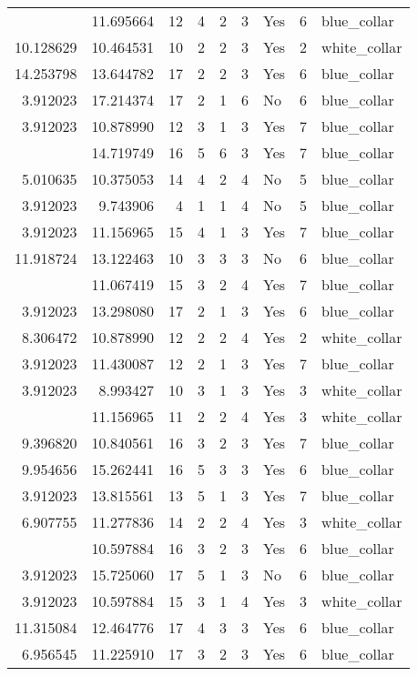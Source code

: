\documentclass[
]{article}
\begin{document}
\begin{longtable}[t]{rrrrrllrl}
\addlinespace
9.905984 & 11.695664 & 12 & 4 & 2 & 3 & Yes & 6 & blue\_collar\\
10.128629 & 10.464531 & 10 & 2 & 2 & 3 & Yes & 2 & white\_collar\\
14.253798 & 13.644782 & 17 & 2 & 2 & 3 & Yes & 6 & blue\_collar\\
3.912023 & 17.214374 & 17 & 2 & 1 & 6 & No & 6 & blue\_collar\\
3.912023 & 10.878990 & 12 & 3 & 1 & 3 & Yes & 7 & blue\_collar\\
\addlinespace
10.715528 & 14.719749 & 16 & 5 & 6 & 3 & Yes & 7 & blue\_collar\\
5.010635 & 10.375053 & 14 & 4 & 2 & 4 & No & 5 & blue\_collar\\
3.912023 & 9.743906 & 4 & 1 & 1 & 4 & No & 5 & blue\_collar\\
3.912023 & 11.156965 & 15 & 4 & 1 & 3 & Yes & 7 & blue\_collar\\
11.918724 & 13.122463 & 10 & 3 & 3 & 3 & No & 6 & blue\_collar\\
\addlinespace
7.279319 & 11.067419 & 15 & 3 & 2 & 4 & Yes & 7 & blue\_collar\\
3.912023 & 13.298080 & 17 & 2 & 1 & 3 & Yes & 6 & blue\_collar\\
8.306472 & 10.878990 & 12 & 2 & 2 & 4 & Yes & 2 & white\_collar\\
3.912023 & 11.430087 & 12 & 2 & 1 & 3 & Yes & 7 & blue\_collar\\
3.912023 & 8.993427 & 10 & 3 & 1 & 3 & Yes & 3 & white\_collar\\
\addlinespace
5.247024 & 11.156965 & 11 & 2 & 2 & 4 & Yes & 3 & white\_collar\\
9.396820 & 10.840561 & 16 & 3 & 2 & 3 & Yes & 7 & blue\_collar\\
9.954656 & 15.262441 & 16 & 5 & 3 & 3 & Yes & 6 & blue\_collar\\
3.912023 & 13.815561 & 13 & 5 & 1 & 3 & Yes & 7 & blue\_collar\\
6.907755 & 11.277836 & 14 & 2 & 2 & 4 & Yes & 3 & white\_collar\\
\addlinespace
4.007333 & 10.597884 & 16 & 3 & 2 & 3 & Yes & 6 & blue\_collar\\
3.912023 & 15.725060 & 17 & 5 & 1 & 3 & No & 6 & blue\_collar\\
3.912023 & 10.597884 & 15 & 3 & 1 & 4 & Yes & 3 & white\_collar\\
11.315084 & 12.464776 & 17 & 4 & 3 & 3 & Yes & 6 & blue\_collar\\
6.956545 & 11.225910 & 17 & 3 & 2 & 3 & Yes & 6 & blue\_collar\\

\end{longtable}
\end{document}

